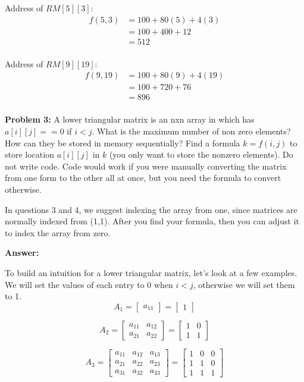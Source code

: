\documentclass[12pt,letterpaper,final]{report}
\begin{document}
Address of $RM[5][3]$:
\begin{align*}
  f(5,3) & = 100 + 80(5) + 4(3) \\
         & = 100 + 400 + 12     \\
         & = 512                \\
\end{align*}

Address of $RM[9][19]$:
\begin{align*}
  f(9,19) & = 100 + 80(9) + 4(19) \\
          & = 100 + 720 + 76      \\
          & = 896                 \\
\end{align*}

\bigskip
\noindent\textbf{Problem 3:}  A lower triangular matrix is an nxn array in which has $a[i][j] == 0$ if $i<j$. What is the maximum number of non zero elements? How can they be stored in memory sequentially? Find a formula $k = f(i,j)$ to store location $a[i][j]$ in $k$ (you only want to store the nonzero elements). Do not write code. Code would work if you were manually converting the matrix from one form to the other all at once, but you need the formula to convert otherwise.

In questions 3 and 4, we suggest indexing the array from one, since matrices are normally indexed from (1,1). After you find your formula, then you can adjust it to index the array from zero.

\noindent\textbf{Answer:}

To build an intuition for a lower triangular matrix, let's look at a few examples. We will set the values of each entry to 0 when $i < j$, otherwise we will set them to 1.
\[
  A_1 =
  \begin{bmatrix}
    a_{11}
  \end{bmatrix}
  =
  \begin{bmatrix}
    1
  \end{bmatrix}
\]

\[
  A_2 =
  \begin{bmatrix}
    a_{11} & a_{12} \\
    a_{21} & a_{22}
  \end{bmatrix}
  =
  \begin{bmatrix}
    1 & 0 \\
    1 & 1
  \end{bmatrix}
\]

\[
  A_3 =
  \begin{bmatrix}
    a_{11} & a_{12} & a_{13} \\
    a_{21} & a_{22} & a_{23} \\
    a_{31} & a_{32} & a_{33}
  \end{bmatrix}
  =
  \begin{bmatrix}
    1 & 0 & 0 \\
    1 & 1 & 0 \\
    1 & 1 & 1
  \end{bmatrix}
\]
\end{document}
